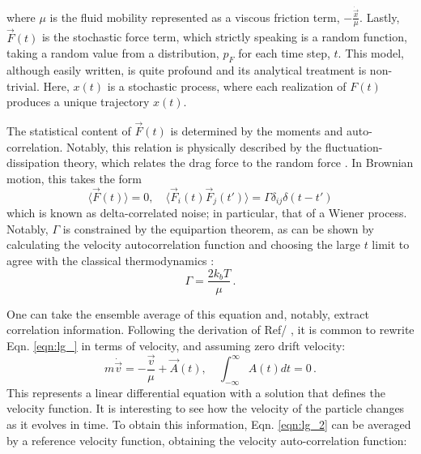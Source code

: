 where $\mu$ is the fluid mobility represented as a viscous friction term, $-\frac{\dot{\vec{x}}}{\mu}$. Lastly, $\vec F(t)$ is the stochastic force term, which strictly speaking is a random function, taking a random value from a distribution, $p_F$ for each time step, $t$. This model, although easily written, is quite profound and its analytical treatment is non-trivial. Here, $x(t)$ is a stochastic process, where each realization of $F(t)$ produces a unique trajectory $x(t)$.

The statistical content of $\vec F(t)$ is determined by the moments and auto-correlation. Notably, this relation is physically described by the fluctuation-dissipation theory, which relates the drag force to the random force \cite{pathriaStatisticalMechanics2011}. In Brownian motion, this takes the form
\begin{equation}
	\langle \vec F(t)\rangle = 0, \quad \langle \vec{F}_i(t) \vec{F}_j(t')\rangle = \Gamma\delta_{ij}\delta(t-t')
\end{equation}
which is known as delta-correlated noise; in particular, that of a Wiener process. Notably, $\Gamma$ is constrained by the equipartion theorem, as can be shown by calculating the velocity autocorrelation function and choosing the large $t$ limit to agree with the classical thermodynamics \cite{pathriaStatisticalMechanics2011}:
\begin{equation}
    \Gamma = \frac{2k_bT}{\mu}\,.
\end{equation}

One can take the ensemble average of this equation and, notably, extract correlation information. Following the derivation of Ref/ \cite{pathriaStatisticalMechanics2011}, it is common to rewrite Eqn. \ref{eqn:lg_} in terms of velocity, and assuming zero drift velocity:
\begin{equation}\label{eqn:lg_2}
	m\dot{\vec{v}} = -\frac{\vec{v}}{\mu} + \vec A(t), \quad \int_{-\infty}^\infty A(t) dt = 0\,.
\end{equation}
This represents a linear differential equation with a solution that defines the velocity function. It is interesting to see how the velocity of the particle changes as it evolves in time. To obtain this information, Eqn. \ref{eqn:lg_2} can be averaged by a reference velocity function, obtaining the velocity auto-correlation function:

